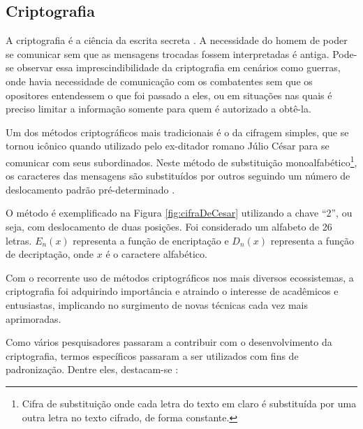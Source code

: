 \documentclass[12pt]{article}
\begin{document}
        \subsection{Criptografia}
        \label{subsec:criptografia}
            
            A criptografia é a ciência da escrita secreta \cite{robling1982cryptoAndDataSec}. A necessidade do homem de poder se comunicar sem que as mensagens trocadas fossem interpretadas é antiga. Pode-se observar essa imprescindibilidade da criptografia em cenários como guerras, onde havia necessidade de comunicação com os combatentes sem que os opositores entendessem o que foi passado a eles, ou em situações nas quais é preciso limitar a informação somente para quem é autorizado a obtê-la.
            
            Um dos métodos criptográficos mais tradicionais é o da cifragem simples, que se tornou icônico quando utilizado pelo ex-ditador romano Júlio César para se comunicar com seus subordinados. Neste método de substituição monoalfabético\footnote{Cifra de substituição onde cada letra do texto em claro é substituída por uma outra letra no texto cifrado, de forma constante.}, os caracteres das mensagens são substituídos por outros seguindo um número de deslocamento padrão pré-determinado \cite{cohen2011short}.
            
            O método é exemplificado na Figura \ref{fig:cifraDeCesar} utilizando a chave ``2'', ou seja, com deslocamento de duas posições. Foi considerado um alfabeto de 26 letras. $E_n(x)$ representa a função de encriptação e $D_n(x)$ representa a função de decriptação, onde $x$ é o caractere alfabético.
            
            
            
            Com o recorrente uso de métodos criptográficos nos mais diversos ecossistemas, a criptografia foi adquirindo importância e atraindo o interesse de acadêmicos e entusiastas, implicando no surgimento de novas técnicas cada vez mais aprimoradas.
            
            Como vários pesquisadores passaram a contribuir com o desenvolvimento da criptografia, termos específicos passaram a ser utilizados com fins de padronização. Dentre eles, destacam-se \cite{robling1982cryptoAndDataSec}\cite{stallings2006cryptography}:
            
\end{document}
